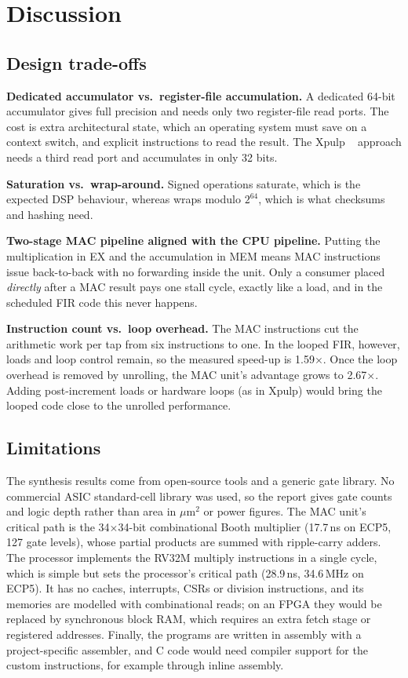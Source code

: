 \chapter{Discussion}\label{ch:disc}

\section{Design trade-offs}
\textbf{Dedicated accumulator vs.\ register-file accumulation.} A
dedicated 64-bit accumulator gives full precision and needs only two
register-file read ports. The cost is extra architectural state, which
an operating system must save on a context switch, and explicit
 instructions to read the result. The Xpulp
~\cite{cv32e40p} approach needs a third read port and
accumulates in only 32 bits.

\textbf{Saturation vs.\ wrap-around.} Signed operations saturate,
which is the expected DSP behaviour, whereas  wraps modulo $2^{64}$,
which is what checksums and hashing need.

\textbf{Two-stage MAC pipeline aligned with the CPU pipeline.} Putting
the multiplication in EX and the accumulation in MEM means MAC
instructions issue back-to-back with no forwarding inside the unit.
Only a consumer placed \emph{directly} after a MAC result pays one
stall cycle, exactly like a load, and in the scheduled FIR code this never
happens.

\textbf{Instruction count vs.\ loop overhead.} The MAC instructions
cut the arithmetic work per tap from six instructions to one. In the
looped FIR, however, loads and loop control remain, so the measured
speed-up is 1.59$\times$. Once the loop overhead is removed by
unrolling, the MAC unit's advantage grows to 2.67$\times$. Adding
post-increment loads or hardware loops (as in Xpulp) would bring the
looped code close to the unrolled performance.

\section{Limitations}
The synthesis results come from open-source tools and a generic gate library.
No commercial ASIC standard-cell library was used, so the report gives gate
counts and logic depth rather than area in $\mu$m$^2$ or power figures. The MAC
unit's critical path is the 34$\times$34-bit combinational Booth multiplier
(17.7\,ns on ECP5, 127 gate levels), whose partial products are summed with
ripple-carry adders. The processor implements the RV32M multiply instructions
in a single cycle, which is simple but sets the processor's critical path
(28.9\,ns, 34.6\,MHz on ECP5). It has no caches, interrupts, CSRs or division
instructions, and its memories are modelled with combinational reads; on an
FPGA they would be replaced by synchronous block RAM, which requires an extra
fetch stage or registered addresses. Finally, the programs are written in
assembly with a project-specific assembler, and C code would need compiler
support for the custom instructions, for example through inline assembly.

